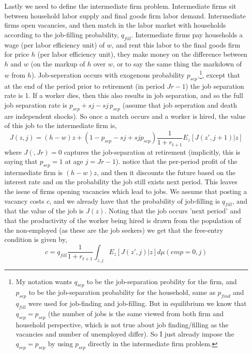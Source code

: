 Lastly we need to define the intermediate firm problem. Intermediate firms sit between household labor supply and final goods firm labor demand. Intermediate firms open vacancies, and then match in the labor market with households according to the job-filling probability, $q_{fill}$. Intermediate firms pay households a wage (per labor efficiency unit) of $w$, and rent this labor to the final goods firm for price $h$ (per labor efficiency unit), they make money on the difference between $h$ and $w$ (on the markup of $h$ over $w$, or to say the same thing the markdown of $w$ from $h$). Job-seperation occurs with exogenous probability $p_{sep}$.\footnote{My notation wants $q_{sep}$ to be the job-separation probility for the firm, and $p_{sep}$ to be the job-separation probability for the household, same as $p_{find}$ and $q_{fill}$ were used for job-finding and job-filling. But in equilibrium we know that $q_{sep}=p_{sep}$ (the number of jobs is the same viewed from both firm and household perspective, which is not true about job finding/filling as the vacancies and number of unemployed differ). So I just already impose the $q_{sep}=p_{sep}$ by using $p_{sep}$ directly in the intermediate firm problem.}, except that at the end of the period prior to retirement (in period $Jr-1$) the job separation rate is 1. If a worker dies, then this also results in job separation, and so the full job separation rate is $p_{sep}+sj-sj \, p_{sep}$ (assume that job seperation and death are independent shocks). So once a match occurs and a worker is hired, the value of this job to the intermediate firm is,
\begin{equation*}
 J(z,j)=(h-w) z + (1-p_{sep}-sj+sj p_{sep}) \frac{1}{1+r_{t+1}} E_z[J(z',j+1)|z]
\end{equation*}
where $J(\dot,Jr)=0$ captures the job-separation at retirement (implicitly, this is saying that $p_{sep}=1$ at age $j=Jr-1$).
notice that the per-period profit of the intermediate firm is $(h-w)z$, and then it discounts the future based on the interest rate and on the probability the job still exists next period. This leaves the issue of firms opening vacancies which lead to jobs. We assume that posting a vacancy costs $c$, and we already have that the probability of job-filling is $q_{fill}$, and that the value of the job is $J(z)$. Noting that the job occurs 'next period' and that the productivity of the worker being hired is drawn from the population of the non-employed (as these are the job seekers) we get that the free-entry condition is given by,
\begin{equation*}
 c=q_{fill} \frac{1}{1+r_{t+1}} \int_{z,j} E_z[J(z',j)|z] d\mu(emp=0,j)
\end{equation*}


